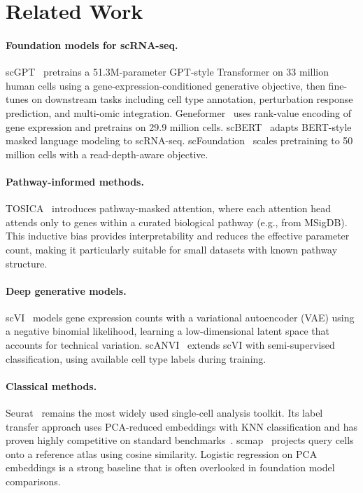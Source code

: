 \documentclass{article}
\begin{document}
\section{Related Work}
\label{sec:related}

\paragraph{Foundation models for scRNA-seq.}
scGPT~\citep{cui2024scgpt} pretrains a 51.3M-parameter GPT-style Transformer on 33 million
human cells using a gene-expression-conditioned generative objective, then fine-tunes on
downstream tasks including cell type annotation, perturbation response prediction, and
multi-omic integration. Geneformer~\citep{theodoris2023transfer} uses rank-value encoding
of gene expression and pretrains on 29.9 million cells. scBERT~\citep{yang2022scbert}
adapts BERT-style masked language modeling to scRNA-seq. scFoundation~\citep{hao2024foundation}
scales pretraining to 50 million cells with a read-depth-aware objective.

\paragraph{Pathway-informed methods.}
TOSICA~\citep{chen2023interpretable} introduces pathway-masked attention, where each
attention head attends only to genes within a curated biological pathway (e.g., from
MSigDB). This inductive bias provides interpretability and reduces the effective parameter
count, making it particularly suitable for small datasets with known pathway structure.

\paragraph{Deep generative models.}
scVI~\citep{lopez2018deep} models gene expression counts with a variational autoencoder
(VAE) using a negative binomial likelihood, learning a low-dimensional latent space that
accounts for technical variation. scANVI~\citep{xu2021probabilistic} extends scVI with
semi-supervised classification, using available cell type labels during training.

\paragraph{Classical methods.}
Seurat~\citep{stuart2019comprehensive,hao2021integrated} remains the most widely used
single-cell analysis toolkit. Its label transfer approach uses PCA-reduced embeddings with
KNN classification and has proven highly competitive on standard benchmarks~\citep{abdelaal2019comparison}.
scmap~\citep{zhang2019scmap} projects query cells onto a reference atlas using cosine
similarity. Logistic regression on PCA embeddings is a strong baseline that is often
overlooked in foundation model comparisons.
\end{document}
